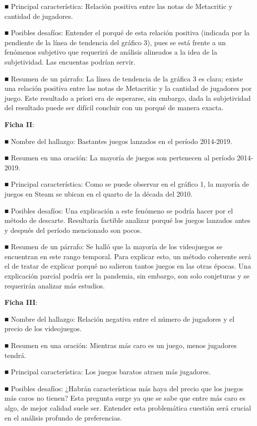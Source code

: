 \documentclass[
  letterpaper,
  DIV=11,
  numbers=noendperiod]{scrreprt}
\begin{document}
■ Principal característica: Relación positiva entre las notas de
Metacritic y cantidad de jugadores.

■ Posibles desafíos: Entender el porqué de esta relación positiva
(indicada por la pendiente de la línea de tendencia del gráfico 3), pues
se está frente a un fenómenos subjetivo que requerirá de análisis
alineados a la idea de la subjetividad. Las encuentas podrían servir.

■ Resumen de un párrafo: La línea de tendencia de la gráfica 3 es clara;
existe una relación positiva entre las notas de Metacritic y la cantidad
de jugadores por juego. Este resultado a priori era de esperarse, sin
embargo, dada la subjetividad del resultado puede ser difícil concluir
con un porqué de manera exacta.

\textbf{Ficha II}:

■ Nombre del hallazgo: Bastantes juegos lanzados en el período
2014-2019.

■ Resumen en una oración: La mayoría de juegos son pertenecen al período
2014-2019.

■ Principal característica: Como se puede observar en el gráfico 1, la
mayoría de juegos en Steam se ubican en el quarto de la década del 2010.

■ Posibles desafíos: Una explicación a este fenómeno se podría hacer por
el método de descarte. Resultaría factible analizar porqué los juegos
lanzados antes y después del período mencionado son pocos.

■ Resumen de un párrafo: Se halló que la mayoría de los videojuegos se
encuentran en este rango temporal. Para explicar esto, un método
coherente será el de tratar de explicar porqué no salieron tantos juegos
en las otras épocas. Una explicación parcial podría ser la pandemia, sin
embargo, son solo conjeturas y se requerirán analizar más estudios.

\textbf{Ficha III}:

■ Nombre del hallazgo: Relación negativa entre el número de jugadores y
el precio de los videojuegos.

■ Resumen en una oración: Mientras más caro es un juego, menos jugadores
tendrá.

■ Principal característica: Los juegos baratos atraen más jugadores.

■ Posibles desafíos: ¿Habrán características más haya del precio que los
juegos más caros no tienen? Esta pregunta surge ya que se sabe que entre
más caro es algo, de mejor calidad suele ser. Entender esta problemática
cuestión será crucial en el análisis profundo de preferencias.
\end{document}
